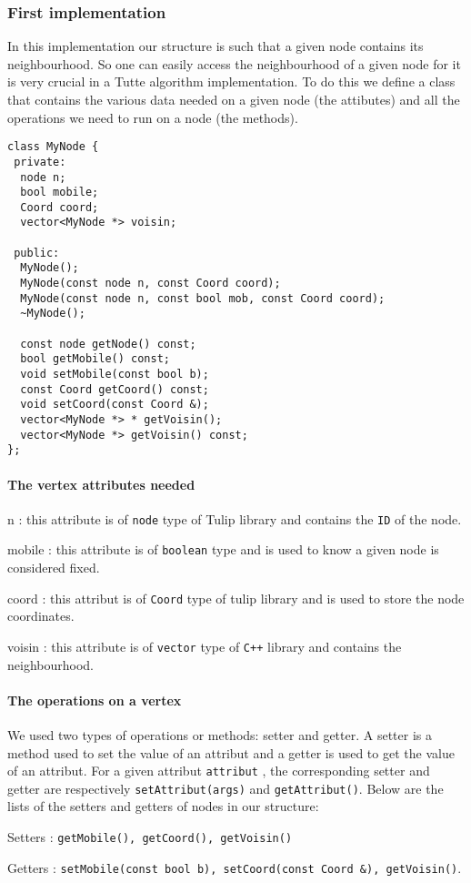 \subsubsection{First implementation}
In this implementation our structure is such that a given node
contains its neighbourhood. So one can easily access the neighbourhood
of a given node for it is very crucial in a Tutte algorithm
implementation. To do this we define a class that contains the various
data needed on a given node (the attibutes) and all the operations we
need to run on a node (the methods).

\newpage
\begin{lstlisting}
class MyNode {
 private:
  node n;
  bool mobile;
  Coord coord;  
  vector<MyNode *> voisin;

 public:
  MyNode();
  MyNode(const node n, const Coord coord);
  MyNode(const node n, const bool mob, const Coord coord);
  ~MyNode();
  
  const node getNode() const;
  bool getMobile() const;
  void setMobile(const bool b);
  const Coord getCoord() const;
  void setCoord(const Coord &);
  vector<MyNode *> * getVoisin();
  vector<MyNode *> getVoisin() const;
};
\end{lstlisting}

\paragraph{The vertex attributes needed}
\begin{dinglist}{70}
\item[n]: this attribute is of \texttt{node} type of \textsf{Tulip} library and contains the \texttt{ID} of the node.  
\item[mobile]: this attribute is of \texttt{boolean} type and is used to know a given node is considered fixed.
\item[coord]: this attribut is of \texttt{Coord} type of \textsf{tulip} library and is used to store the node coordinates. 
\item[voisin]: this attribute is of \texttt{vector} type of \texttt{C++} library and contains the neighbourhood.
\end{dinglist}

\paragraph{The operations on a vertex}
We used two types of operations or methods: \textsf{setter} and
\textsf{getter}. A \textsf{setter} is a method used to set the value
of an attribut and a \textsf{getter} is used to get the value of an
attribut. For a given attribut \texttt{attribut} , the corresponding
setter and getter are respectively \verb+setAttribut(args)+ and \verb+getAttribut()+. Below are the lists of the setters and getters of nodes in our structure:
\begin{dinglist}{70}
\item[Setters]: \verb+getMobile(), getCoord(), getVoisin()+  
\item[Getters]: \verb+setMobile(const bool b), setCoord(const Coord &), getVoisin()+.
\end{dinglist}

